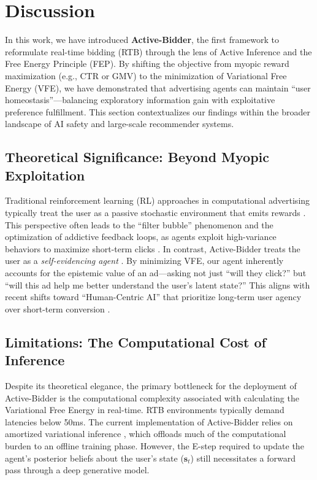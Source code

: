 \section{Discussion}

In this work, we have introduced \textbf{Active-Bidder}, the first framework to reformulate real-time bidding (RTB) through the lens of Active Inference and the Free Energy Principle (FEP). By shifting the objective from myopic reward maximization (e.g., CTR or GMV) to the minimization of Variational Free Energy (VFE), we have demonstrated that advertising agents can maintain ``user homeostasis''---balancing exploratory information gain with exploitative preference fulfillment. This section contextualizes our findings within the broader landscape of AI safety and large-scale recommender systems.

\subsection{Theoretical Significance: Beyond Myopic Exploitation}
Traditional reinforcement learning (RL) approaches in computational advertising typically treat the user as a passive stochastic environment that emits rewards \cite{sutton2018reinforcement}. This perspective often leads to the ``filter bubble'' phenomenon and the optimization of addictive feedback loops, as agents exploit high-variance behaviors to maximize short-term clicks \cite{milano2020recommender}. In contrast, Active-Bidder treats the user as a \textit{self-evidencing agent} \cite{friston2010action}. By minimizing VFE, our agent inherently accounts for the epistemic value of an ad---asking not just ``will they click?'' but ``will this ad help me better understand the user's latent state?'' This aligns with recent shifts toward ``Human-Centric AI'' that prioritize long-term user agency over short-term conversion \cite{shneiderman2022human, zhang2024trustworthy}.

\subsection{Limitations: The Computational Cost of Inference}
Despite its theoretical elegance, the primary bottleneck for the deployment of Active-Bidder is the computational complexity associated with calculating the Variational Free Energy in real-time. RTB environments typically demand latencies below 50ms. The current implementation of Active-Bidder relies on amortized variational inference \cite{kingma2013auto}, which offloads much of the computational burden to an offline training phase. However, the E-step required to update the agent's posterior beliefs about the user's state ($\mathbf{s}_t$) still necessitates a forward pass through a deep generative model.

